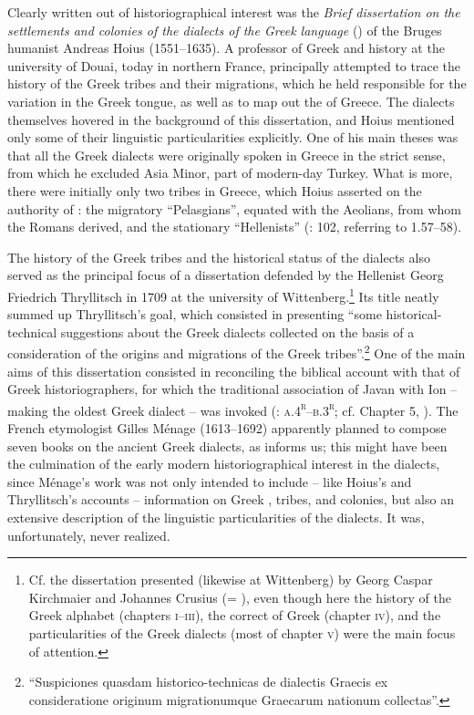 Clearly written out of historiographical interest was the \textit{Brief dissertation on the settlements and colonies of the dialects of the Greek language} (\citeyear{Hoius1620}) of the Bruges humanist Andreas Hoius (1551–1635). A professor of Greek and history at the university of Douai, today in northern France, \citet[95]{Hoius1620} principally attempted to trace the history of the Greek tribes and their migrations, which he held responsible for the variation in the Greek tongue, as well as to map out the  of Greece. The dialects themselves hovered in the background of this dissertation, and Hoius mentioned only some of their linguistic particularities explicitly. One of his main theses was that all the Greek dialects were originally spoken in Greece in the strict sense, from which he excluded Asia Minor, part of modern-day Turkey.\textsuperscript{} What is more, there were initially only two tribes in Greece, which Hoius asserted on the authority of : the migratory “Pelasgians”, equated with the Aeolians, from whom the Romans derived, and the stationary “Hellenists” (\citealt{Hoius1620}: 102, referring to  1.57–58).

The history of the Greek tribes and the historical status of the dialects also served as the principal focus of a dissertation defended by the Hellenist Georg Friedrich Thryllitsch in 1709 at the university of Wittenberg.\footnote{Cf. the dissertation presented (likewise at Wittenberg) by Georg Caspar Kirchmaier and Johannes Crusius (= \citealt{KirchmaierCrusius1684}), even though here the history of the Greek alphabet (chapters \textsc{i}{}--\textsc{iii}), the correct  of Greek (chapter \textsc{iv}), and the particularities of the Greek dialects (most of chapter \textsc{v}) were the main focus of attention.} Its title neatly summed up Thryllitsch’s goal, which consisted in presenting “some historical-technical suggestions about the Greek dialects collected on the basis of a consideration of the origins and migrations of the Greek tribes”.\footnote{“Suspiciones quasdam historico-technicas de dialectis Graecis ex consideratione originum migrationumque Graecarum nationum collectas”.} One of the main aims of this dissertation consisted in reconciling the biblical account with that of Greek historiographers, for which the traditional association of Javan with Ion – making  the oldest Greek dialect – was invoked (\citealt{Thryllitsch1709}: \textsc{a.4}\textsc{\textsuperscript{r}}\textsc{–b.3}\textsc{\textsuperscript{r}}; cf. Chapter 5, ). The French etymologist Gilles Ménage (1613–1692) apparently planned to compose seven books on the ancient Greek dialects, as \citet[252]{Leibniz1991} informs us; this might have been the culmination of the early modern historiographical interest in the dialects, since Ménage’s work was not only intended to include – like Hoius’s and Thryllitsch’s accounts – information on Greek , tribes, and colonies, but also an extensive description of the linguistic particularities of the dialects. It was, unfortunately, never realized.

